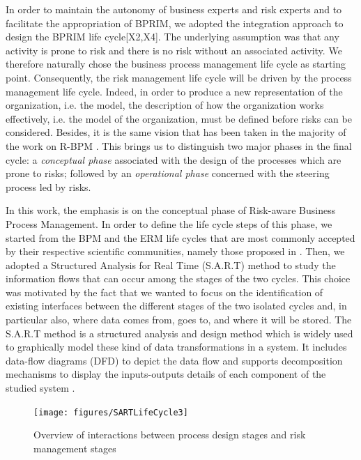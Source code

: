 \documentclass[preprint,3p,times,number]{elsarticle}
\begin{document}
In order to maintain the autonomy of business experts and risk experts and to facilitate the appropriation of BPRIM, we adopted the integration approach to design the BPRIM life cycle[X2,X4]. %
The underlying assumption was that any activity is prone to risk and there is no risk without an associated activity. We therefore naturally chose the business process management life cycle as starting point. Consequently, the risk management life cycle will be driven by the process management life cycle. Indeed, in order to produce a new representation of the organization, i.e. the  model, the description of how the organization works effectively, i.e. the  model of the organization, must be defined before risks can be considered. Besides, it is the same vision that has been taken in the majority of the work on R-BPM \cite{jakoubi_roadmap_2010, conforti_supporting_2013, suriadi_current_2014}. This brings us to distinguish two major phases in the final cycle: a \emph{conceptual phase} associated with the design of the processes which are prone to risks; followed by an \emph{operational phase} concerned with the steering process led by risks.

In this work, the emphasis is on the conceptual phase of Risk-aware Business Process Management. In order to define the life cycle steps of this phase, we started from the BPM and the ERM life cycles that are most commonly accepted by their respective scientific communities, namely those proposed in \cite{dumas_fundamentals_2018,iso_iso_2009}. Then, we adopted a Structured Analysis for Real Time (S.A.R.T) method to study the information flows that can occur among the stages of the two cycles. This choice was motivated by the fact that we wanted to focus on the identification of existing interfaces between the different stages of the two isolated cycles and, in particular also, where data comes from, goes to, and where it will be stored. The S.A.R.T method is a structured analysis and design method which is widely used to graphically model these kind of data transformations in a system. It includes data-flow diagrams (DFD) to depict the data flow and supports decomposition mechanisms to display the inputs-outputs details of each component of the studied system \cite{von_scheel_phase_2015}.


\begin{figure}[t]
 \begin{center}
    \texttt{[image: figures/SARTLifeCycle3]}
    \caption{Overview of interactions between process design stages and risk management stages}
    \label{fig:Overviewofinteractions}
 \end{center}
\end{figure}
\end{document}
